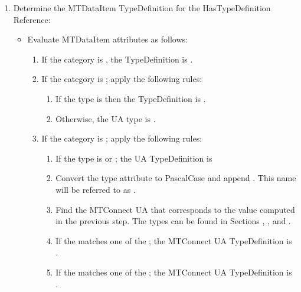 \begin{enumerate}
  \item Determine the \gls{MTDataItem} \gls{TypeDefinition} for the \gls{HasTypeDefinition} \gls{Reference}:
  \begin{itemize}
    \item Evaluate \gls{MTDataItem} attributes as follows:
    \begin{enumerate}
      \setlength\itemsep{1em}
      \item If the \gls{category} is , the \gls{TypeDefinition} is .
      
      \item If the \gls{category} is ; apply the following rules:
      \begin{enumerate}
        \item If the \gls{type} is  then the \gls{TypeDefinition} is .
        \item Otherwise, the UA type is .
      \end{enumerate}
      
      \item If the \gls{category} is ; apply the following rules:
      \begin{enumerate}
        \setlength\itemsep{1em}
        \item If the \gls{type} is  or ; the UA \gls{TypeDefinition} is 
        
        \item Convert the \gls{type} attribute to \gls{PascalCase} and append . This name will be referred to as .
        
        \item Find the MTConnect UA  that corresponds to the value computed in the previous step.
        The types can be found in Sections , , and .
        
        \item If the  matches one of the ; the MTConnect UA \gls{TypeDefinition} is .
        
        \item If the  matches one of the ; the MTConnect UA \gls{TypeDefinition}  is .
        

\end{enumerate}
\end{enumerate}
\end{itemize}
\end{enumerate}
